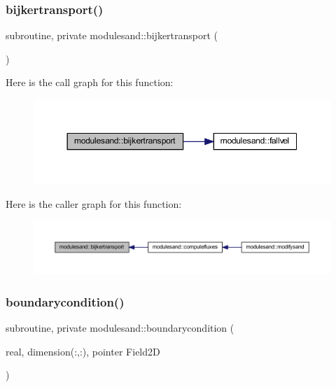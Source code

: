 \subsubsection{\texorpdfstring{bijkertransport()}{bijkertransport()}}
{\footnotesize\ttfamily subroutine, private modulesand\+::bijkertransport (\begin{DoxyParamCaption}{ }\end{DoxyParamCaption})\hspace{0.3cm}{\ttfamily [private]}}

Here is the call graph for this function\+:\nopagebreak
\begin{figure}[H]
\begin{center}
\leavevmode
\includegraphics[width=350pt]{namespacemodulesand_ae86fef0e135985c199efb346e08b85dc_cgraph}
\end{center}
\end{figure}
Here is the caller graph for this function\+:\nopagebreak
\begin{figure}[H]
\begin{center}
\leavevmode
\includegraphics[width=350pt]{namespacemodulesand_ae86fef0e135985c199efb346e08b85dc_icgraph}
\end{center}
\end{figure}
\mbox{\label{namespacemodulesand_a24a6518a059721913dd87b9b1d7f2c4d}} 
\subsubsection{\texorpdfstring{boundarycondition()}{boundarycondition()}}
{\footnotesize\ttfamily subroutine, private modulesand\+::boundarycondition (\begin{DoxyParamCaption}\item[{real, dimension(\+:,\+:), pointer}]{Field2D }\end{DoxyParamCaption})\hspace{0.3cm}{\ttfamily [private]}}

